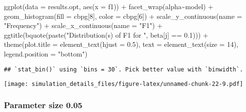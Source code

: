 \documentclass[
]{article}
\newenvironment{Shaded}{\begin{snugshade}}{\end{snugshade}}
\newcommand{\AttributeTok}[1]{\textcolor[rgb]{0.77,0.63,0.00}{#1}}
\newcommand{\DecValTok}[1]{\textcolor[rgb]{0.00,0.00,0.81}{#1}}
\newcommand{\FloatTok}[1]{\textcolor[rgb]{0.00,0.00,0.81}{#1}}
\newcommand{\FunctionTok}[1]{\textcolor[rgb]{0.00,0.00,0.00}{#1}}
\newcommand{\NormalTok}[1]{#1}
\newcommand{\SpecialCharTok}[1]{\textcolor[rgb]{0.00,0.00,0.00}{#1}}
\newcommand{\StringTok}[1]{\textcolor[rgb]{0.31,0.60,0.02}{#1}}
\begin{document}
\begin{Shaded}
\begin{Highlighting}[]
\FunctionTok{ggplot}\NormalTok{(}\AttributeTok{data =}\NormalTok{ results.opt,}
       \FunctionTok{aes}\NormalTok{(}\AttributeTok{x =}\NormalTok{ f1)) }\SpecialCharTok{+}
  \FunctionTok{facet\_wrap}\NormalTok{(alpha}\SpecialCharTok{\textasciitilde{}}\NormalTok{model) }\SpecialCharTok{+}
  \FunctionTok{geom\_histogram}\NormalTok{(}\AttributeTok{fill =}\NormalTok{ cbpg[}\DecValTok{8}\NormalTok{], }\AttributeTok{color =}\NormalTok{ cbpg[}\DecValTok{6}\NormalTok{]) }\SpecialCharTok{+}
  \FunctionTok{scale\_y\_continuous}\NormalTok{(}\AttributeTok{name =} \StringTok{"Frequency"}\NormalTok{) }\SpecialCharTok{+}
  \FunctionTok{scale\_x\_continuous}\NormalTok{(}\AttributeTok{name =} \StringTok{"F1"}\NormalTok{) }\SpecialCharTok{+}
  \FunctionTok{ggtitle}\NormalTok{(}\FunctionTok{bquote}\NormalTok{(}\FunctionTok{paste}\NormalTok{(}\StringTok{"Distribution(s) of F1 for "}\NormalTok{, beta[j] }\SpecialCharTok{==} \FloatTok{0.1}\NormalTok{))) }\SpecialCharTok{+}
  \FunctionTok{theme}\NormalTok{(}\AttributeTok{plot.title =} \FunctionTok{element\_text}\NormalTok{(}\AttributeTok{hjust =} \FloatTok{0.5}\NormalTok{), }
        \AttributeTok{text =} \FunctionTok{element\_text}\NormalTok{(}\AttributeTok{size =} \DecValTok{14}\NormalTok{),}
        \AttributeTok{legend.position =} \StringTok{"bottom"}\NormalTok{)}
\end{Highlighting}
\end{Shaded}

\begin{verbatim}
## `stat_bin()` using `bins = 30`. Pick better value with `binwidth`.
\end{verbatim}

\texttt{[image: simulation\_details\_files/figure-latex/unnamed-chunk-22-9.pdf]}

\hypertarget{parameter-size-0.05}{%
\subsubsection{Parameter size 0.05}\label{parameter-size-0.05}}
\end{document}
